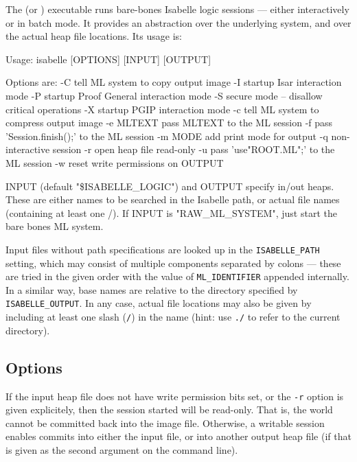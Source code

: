 The  (or ) executable runs
bare-bones Isabelle logic sessions --- either interactively or in batch mode.
It provides an abstraction over the underlying {\ML} system, and over the
actual heap file locations.  Its usage is:
\begin{ttbox}
Usage: isabelle [OPTIONS] [INPUT] [OUTPUT]

  Options are:
    -C           tell ML system to copy output image
    -I           startup Isar interaction mode
    -P           startup Proof General interaction mode
    -S           secure mode -- disallow critical operations
    -X           startup PGIP interaction mode
    -c           tell ML system to compress output image
    -e MLTEXT    pass MLTEXT to the ML session
    -f           pass 'Session.finish();' to the ML session
    -m MODE      add print mode for output
    -q           non-interactive session
    -r           open heap file read-only
    -u           pass 'use"ROOT.ML";' to the ML session
    -w           reset write permissions on OUTPUT

  INPUT (default "\$ISABELLE_LOGIC") and OUTPUT specify in/out heaps.
  These are either names to be searched in the Isabelle path, or
  actual file names (containing at least one /).
  If INPUT is "RAW_ML_SYSTEM", just start the bare bones ML system.
\end{ttbox}
Input files without path specifications are looked up in the
\texttt{ISABELLE_PATH} setting, which may consist of multiple components
separated by colons --- these are tried in the given order with the value of
\texttt{ML_IDENTIFIER} appended internally.  In a similar way, base names are
relative to the directory specified by \texttt{ISABELLE_OUTPUT}.  In any case,
actual file locations may also be given by including at least one slash
(\texttt{/}) in the name (hint: use \texttt{./} to refer to the current
directory).


\subsection*{Options}

If the input heap file does not have write permission bits set, or the
\texttt{-r} option is given explicitely, then the session started will be
read-only.  That is, the {\ML} world cannot be committed back into the image
file.  Otherwise, a writable session enables commits into either the input
file, or into another output heap file (if that is given as the second
argument on the command line).

